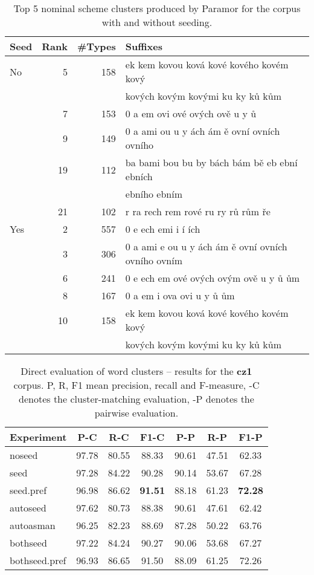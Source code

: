 \begin{table}[h]
\begin{center}
\begin{tabular}{lrrl}
\toprule
\bf Seed & \bf Rank & \bf \#Types & \bf Suffixes\\
\midrule
No& 5  & 158 & ek kem kovou ková kové kového kovém kový \\
 &    &     & kových kovým kovými ku ky ků kům\\
 & 7  & 153 & 0 a em ovi ové ových ově u y ů\\
 & 9  & 149 & 0 a ami ou u y ách ám ě ovní ovních ovního\\
 & 19 & 112 & ba bami bou bu by bách bám bě eb ební ebních\\
 &    &     &  ebního ebním\\
 & 21 & 102 & r ra rech rem rové ru ry rů rům ře\\
\midrule
Yes& 2  & 557 & 0 e ech emi i í ích\\
 & 3  & 306 & 0 a ami e ou u y ách ám ě ovní ovních ovního ovním\\
 & 6  & 241 & 0 e ech em ové ových ovým ově u y ů ům\\
 & 8  & 167 & 0 a em i ova ovi u y ů ům\\
 & 10 & 158 & ek kem kovou ková kové kového kovém kový\\ 
 &    &     & kových kovým kovými ku ky ků kům\\
\bottomrule
\end{tabular}
\end{center}
\caption{\label{table:noun_pdgms} Top 5 nominal scheme clusters produced by Paramor for the  corpus with and without seeding.}
\end{table}

\begin{table}[hp]
\begin{center}
\begin{tabular}{lcccccc}
\toprule
\bf Experiment & \bf P-C & \bf R-C & \bf F1-C & \bf P-P & \bf R-P & \bf F1-P\\
\midrule
noseed & 97.78 & 80.55 & 88.33 & 90.61 & 47.51 & 62.33\\
seed & 97.28 & 84.22 & 90.28 & 90.14 & 53.67 & 67.28\\
seed.pref & 96.98 & 86.62 & \bf 91.51 & 88.18 & 61.23 & \bf 72.28\\
autoseed & 97.62 & 80.73 & 88.38 & 90.61 & 47.61 & 62.42\\
autoasman & 96.25 & 82.23 & 88.69 & 87.28 & 50.22 & 63.76\\
bothseed & 97.22 & 84.24 & 90.27 & 90.06 & 53.68 & 67.27\\
bothseed.pref & 96.93 & 86.65 & 91.50 & 88.09 & 61.25 & 72.26\\
\bottomrule
\end{tabular}
\end{center}
\caption{\label{table:res:cz10:direct} Direct evaluation of word clusters -- results for the \textbf{cz1} corpus. P, R, F1 mean precision, recall and F-measure, -C denotes the cluster-matching evaluation, -P denotes the pairwise evaluation.}
\end{table}


